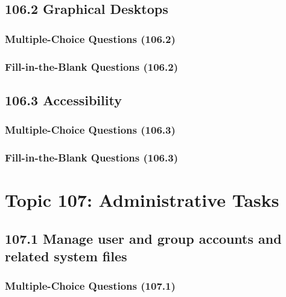 \documentclass[a4paper]{report}
\begin{document}
\subsection*{106.2 Graphical Desktops}
\subsubsection*{Multiple-Choice Questions (106.2)}

\subsubsection*{Fill-in-the-Blank Questions (106.2)}

\subsection*{106.3 Accessibility}
\subsubsection*{Multiple-Choice Questions (106.3)}

\subsubsection*{Fill-in-the-Blank Questions (106.3)}


\section*{Topic 107: Administrative Tasks}

\subsection*{107.1 Manage user and group accounts and related system files}
\subsubsection*{Multiple-Choice Questions (107.1)}
\end{document}
